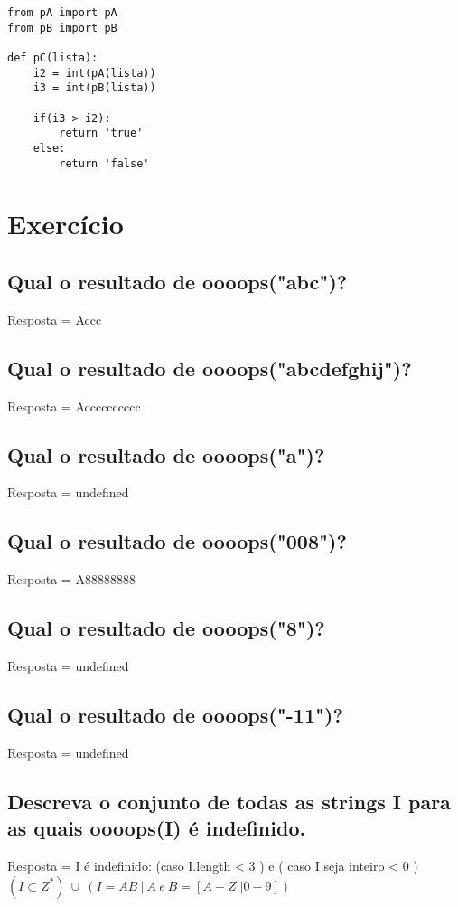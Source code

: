 \documentclass[12pt]{scrartcl}
\begin{document}
\begin{verbatim}
from pA import pA
from pB import pB

def pC(lista):
    i2 = int(pA(lista))
    i3 = int(pB(lista))

    if(i3 > i2):
        return 'true'
    else:
        return 'false'
\end{verbatim}

\section{Exercício}
\subsection{Qual o resultado de oooops("abc")?}
Resposta = Accc

\subsection{Qual o resultado de oooops("abcdefghij")?}
Resposta = Acccccccccc

\subsection{Qual o resultado de oooops("a")?}
Resposta = undefined

\subsection{Qual o resultado de oooops("008")?}
Resposta = A88888888

\subsection{Qual o resultado de oooops("8")?}
Resposta = undefined

\subsection{Qual o resultado de oooops("-11")?}
Resposta = undefined

\subsection{Descreva o conjunto de todas as strings I para as quais oooops(I) é indefinido.}
Resposta = I é indefinido: (caso I.length < 3 ) e ( caso I seja inteiro < 0 )\newline\newline
$(I \subset  Z^*) \ \cup\ (I=AB\ | \ A \ e \ B = [A-Z||0-9])$
\end{document}

